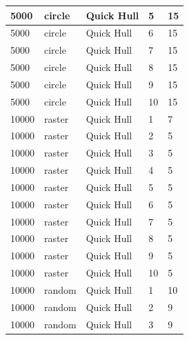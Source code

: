 \documentclass[12pt]{article}
\begin{document}
\begin{longtable}{|l|l|l|l|l|}
5000         & circle            & Quick Hull & 5          & 15                            \\ \hline
5000         & circle            & Quick Hull & 6          & 15                            \\ \hline
5000         & circle            & Quick Hull & 7          & 15                            \\ \hline
5000         & circle            & Quick Hull & 8          & 15                            \\ \hline
5000         & circle            & Quick Hull & 9          & 15                            \\ \hline
5000         & circle            & Quick Hull & 10         & 15                            \\ \hline
10000        & raster            & Quick Hull & 1          & 7                             \\ \hline
10000        & raster            & Quick Hull & 2          & 5                             \\ \hline
10000        & raster            & Quick Hull & 3          & 5                             \\ \hline
10000        & raster            & Quick Hull & 4          & 5                             \\ \hline
10000        & raster            & Quick Hull & 5          & 5                             \\ \hline
10000        & raster            & Quick Hull & 6          & 5                             \\ \hline
10000        & raster            & Quick Hull & 7          & 5                             \\ \hline
10000        & raster            & Quick Hull & 8          & 5                             \\ \hline
10000        & raster            & Quick Hull & 9          & 5                             \\ \hline
10000        & raster            & Quick Hull & 10         & 5                             \\ \hline
10000        & random            & Quick Hull & 1          & 10                            \\ \hline
10000        & random            & Quick Hull & 2          & 9                             \\ \hline
10000        & random            & Quick Hull & 3          & 9                             \\ \hline

\end{longtable}
\end{document}
